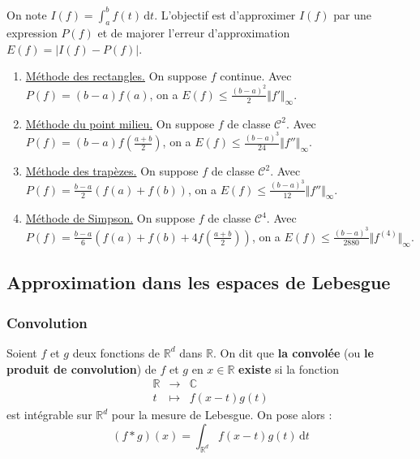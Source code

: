 	\begin{application}
		On note $I(f) = \int_a^b f(t) \, \mathrm{d}t$. L'objectif est d'approximer $I(f)$ par une expression $P(f)$ et de majorer l'erreur d'approximation $E(f) = \vert I(f) - P(f) \vert$.
		\begin{enumerate}[label=(\roman*)]
			\item \underline{Méthode des rectangles.} On suppose $f$ continue. Avec $P(f) = (b-a)f(a)$, on a $E(f) \leq \frac{(b-a)^2}{2} \Vert f' \Vert_\infty$.
			\item \underline{Méthode du point milieu.} On suppose $f$ de classe $\mathcal{C}^2$. Avec $P(f) = (b-a)f \left( \frac{a+b}{2} \right)$, on a $E(f) \leq \frac{(b-a)^3}{24} \Vert f'' \Vert_\infty$.
			\item \underline{Méthode des trapèzes.} On suppose $f$ de classe $\mathcal{C}^2$. Avec $P(f) = \frac{b-a}{2} (f(a) + f(b))$, on a $E(f) \leq \frac{(b-a)^3}{12} \Vert f'' \Vert_\infty$.
			\item \underline{Méthode de Simpson.} On suppose $f$ de classe $\mathcal{C}^4$. Avec $P(f) = \frac{b-a}{6} \left(f(a) + f(b) + 4f \left( \frac{a+b}{2} \right)\right)$, on a $E(f) \leq \frac{(b-a)^3}{2880} \Vert f^{(4)} \Vert_\infty$.
		\end{enumerate}
	\end{application}

	\subsection{Approximation dans les espaces de Lebesgue}

	\subsubsection{Convolution}


	\begin{definition}
		Soient $f$ et $g$ deux fonctions de $\mathbb{R}^d$ dans $\mathbb{R}$. On dit que \textbf{la convolée} (ou \textbf{le produit de convolution}) de $f$ et $g$ en $x \in \mathbb{R}$ \textbf{existe} si la fonction
		\[
		\begin{array}{ccc}
			\mathbb{R} &\rightarrow& \mathbb{C} \\
			t &\mapsto& f(x-t)g(t)
		\end{array}
		\]
		est intégrable sur $\mathbb{R}^d$ pour la mesure de Lebesgue. On pose alors :
		\[ (f * g)(x) = \int_{\mathbb{R}^d} f(x-t)g(t) \, \mathrm{d}t \]
	\end{definition}

